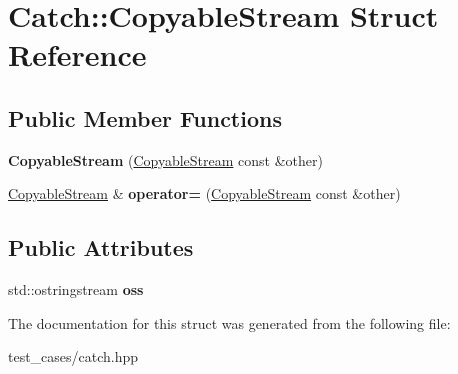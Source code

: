 \hypertarget{structCatch_1_1CopyableStream}{}\section{Catch\+:\+:Copyable\+Stream Struct Reference}
\label{structCatch_1_1CopyableStream}
\subsection*{Public Member Functions}
\begin{DoxyCompactItemize}
\item 
\mbox{\label{structCatch_1_1CopyableStream_a0e72dc16240653f52c17106f4bf34da8}} 
{\bfseries Copyable\+Stream} (\hyperlink{structCatch_1_1CopyableStream}{Copyable\+Stream} const \&other)
\item 
\mbox{\label{structCatch_1_1CopyableStream_a1760fa29b38011c5845171260bec0966}} 
\hyperlink{structCatch_1_1CopyableStream}{Copyable\+Stream} \& {\bfseries operator=} (\hyperlink{structCatch_1_1CopyableStream}{Copyable\+Stream} const \&other)
\end{DoxyCompactItemize}
\subsection*{Public Attributes}
\begin{DoxyCompactItemize}
\item 
\mbox{\label{structCatch_1_1CopyableStream_ae123fb4d673e7d7a13a3c5f6bc5d426c}} 
std\+::ostringstream {\bfseries oss}
\end{DoxyCompactItemize}


The documentation for this struct was generated from the following file\+:\begin{DoxyCompactItemize}
\item 
test\+\_\+cases/catch.\+hpp\end{DoxyCompactItemize}
